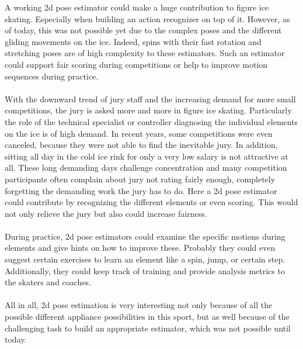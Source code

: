     A working 2d pose estimator could make a huge contribution to figure ice skating.
    Especially when building an action recognizer on top of it.
    However, as of today, this was not possible yet due to the complex poses and the different gliding movements
    on the ice.
    Indeed, spins with their fast rotation and stretching poses are of high complexity to these estimators.
    Such an estimator could support fair scoring during competitions or help to improve motion sequences during
    practice.
    \\\mbox{}\\
    With the downward trend of jury staff and the increasing demand for more small competitions, the jury is asked
    more and more in figure ice skating.
    Particularly the role of the technical specialist or controller diagnosing the individual elements on the ice
    is of high demand.
    In recent years, some competitions were even canceled, because they were not able to find the inevitable jury.
    In addition, sitting all day in the cold ice rink for only a very low salary is not attractive at all.
    These long demanding days challenge concentration and many competition participants often complain about jury
    not rating fairly enough,
    completely forgetting the demanding work the jury has to do.
    Here a 2d pose estimator could contribute by recognizing the different elements or even scoring.
    This would not only relieve the jury but also could increase fairness.
    \\\mbox{}\\
    During practice, 2d pose estimators could examine the specific motions during elements and give hints on how to
    improve these.
    Probably they could even suggest certain exercises to learn an element like a spin, jump, or certain step.
    Additionally, they could keep track of training and provide analysis metrics to the skaters and coaches.
    \\\mbox{}\\
    All in all, 2d pose estimation is very interesting not only because of all the possible different appliance
    possibilities in this sport,
    but as well because of the
    challenging task to build an appropriate estimator, which was not possible until today.



